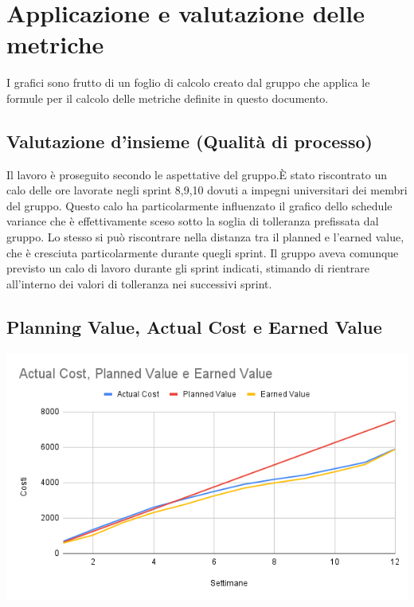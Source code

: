 \documentclass[12pt]{article}
\begin{document}
\section {Applicazione e valutazione delle metriche}
I grafici sono frutto di un foglio di calcolo creato dal gruppo che applica le formule per il calcolo delle metriche definite in questo documento.

\subsection{Valutazione d’insieme (Qualità di processo)}
Il lavoro è proseguito secondo le aspettative del gruppo.È stato riscontrato un calo delle ore lavorate negli sprint 8,9,10 dovuti a impegni universitari dei membri del gruppo. Questo calo ha particolarmente influenzato il grafico dello schedule variance che è effettivamente sceso sotto la soglia di tolleranza prefissata dal gruppo. Lo stesso si può riscontrare nella distanza tra il planned e l’earned value, che è cresciuta particolarmente durante quegli sprint. Il gruppo aveva comunque previsto un calo di lavoro durante gli sprint indicati, stimando di rientrare all’interno dei valori di tolleranza nei successivi sprint.

\subsection{Planning Value, Actual Cost e Earned Value}
\begin{center}
	\includegraphics[scale=0.5]{AC_PV_EV.png}
\end{center}
\end{document}
